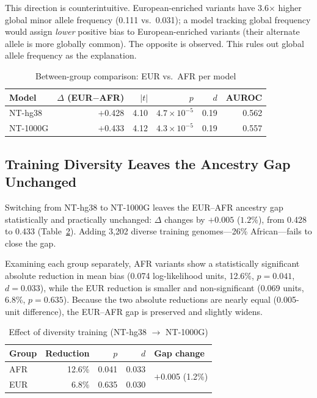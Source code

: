 \documentclass[conference]{IEEEtran}
\begin{document}
This direction is counterintuitive. European-enriched variants have 3.6$\times$
higher global minor allele frequency (0.111 vs.\ 0.031); a model tracking
global frequency would assign \emph{lower} positive bias to European-enriched
variants (their alternate allele is more globally common). The opposite is
observed. This rules out global allele frequency as the explanation.

\begin{table}[t]
\caption{Between-group comparison: EUR vs.\ AFR per model}
\label{tab:between_group}
\centering
\renewcommand{\arraystretch}{1.15}
\begin{tabular}{@{}lrrrrr@{}}
\toprule
Model & $\Delta$ (EUR$-$AFR) & $|t|$ & $p$ & $d$ & AUROC \\
\midrule
NT-hg38  & $+$0.428 & 4.10 & $4.7{\times}10^{-5}$ & 0.19 & 0.562 \\
NT-1000G & $+$0.433 & 4.12 & $4.3{\times}10^{-5}$ & 0.19 & 0.557 \\
\bottomrule
\end{tabular}
\end{table}

\subsection{Training Diversity Leaves the Ancestry Gap Unchanged}

Switching from NT-hg38 to NT-1000G leaves the EUR--AFR ancestry gap
statistically and practically unchanged: $\Delta$ changes by $+0.005$
($\mathbf{1.2\%}$), from 0.428 to 0.433 (Table~\ref{tab:between_model}).
Adding 3{,}202 diverse training genomes---26\% African---fails to close the gap.

Examining each group separately, AFR variants show a statistically significant
absolute reduction in mean bias (0.074 log-likelihood units, 12.6\%, $p{=}0.041$,
$d{=}0.033$), while the EUR reduction is smaller and non-significant (0.069 units,
6.8\%, $p{=}0.635$). Because the two absolute reductions are nearly equal
(0.005-unit difference), the EUR--AFR gap is preserved and slightly widens.

\begin{table}[t]
\caption{Effect of diversity training (NT-hg38 $\rightarrow$ NT-1000G)}
\label{tab:between_model}
\centering
\renewcommand{\arraystretch}{1.15}
\begin{tabular}{@{}lrrrl@{}}
\toprule
Group & Reduction & $p$ & $d$ & Gap change \\
\midrule
AFR & 12.6\% & 0.041 & 0.033 & \multirow{2}{*}{$+$0.005 (1.2\%)} \\
EUR &  6.8\% & 0.635 & 0.030 & \\
\bottomrule
\end{tabular}
\end{table}
\end{document}
